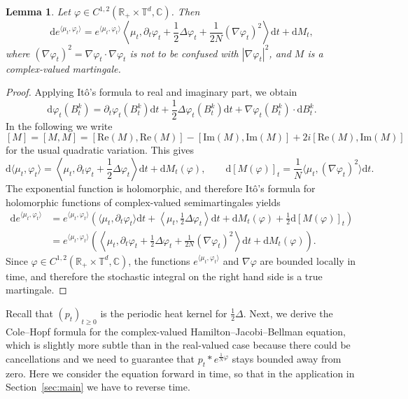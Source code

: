 \documentclass[a4paper,12pt]{article}
\newcommand{\mathd}{\mathrm{d}}
\newtheorem{lemma}[theorem]{Lemma}
\newcommand{\R}{\mathbb{R}}
\newcommand{\T}{\mathbb{T}}
\newcommand{\C}{\mathbb{C}}
\begin{document}
\begin{lemma}\label{lem:duality}
    Let $\varphi\in C^{1,2}(\R_+\times \T^d,\C)$. Then
    \[
        \mathd e^{\langle \mu_t, \varphi_t \rangle} = e^{\langle \mu_t, \varphi_t \rangle}  \left\langle \mu_t,  \partial_t \varphi_t + \frac{1}{2} \Delta \varphi_t + \frac{1}{2 N} (\nabla  \varphi_t)^2 \right\rangle \mathd t  + \mathd M_t,
    \]
    where $(\nabla \varphi_t)^2 = \nabla \varphi_t\cdot \nabla \varphi_t$ is not to be confused with $|\nabla \varphi_t|^2$, and $M$ is a complex-valued martingale.
\end{lemma}

\begin{proof}
    Applying It\^o's formula to real and imaginary part, we obtain
\[ \mathd \varphi_t (B^k_t) = \partial_t \varphi_t(B^k_t)\mathd t + \frac{1}{2} \Delta \varphi_t (B^k_t)\mathd t + \nabla
   \varphi_t (B^k_t) \cdot \mathd B^k_t. \]
In the following we write
    \[
        [M]=[M,M] = [\mathrm{Re}(M), \mathrm{Re}(M)] - [\mathrm{Im}(M),\mathrm{Im}(M)] + 2i[\mathrm{Re}(M),\mathrm{Im}(M)]
    \]
    for the usual quadratic variation. This gives
\[ \mathd \langle \mu_t, \varphi_t \rangle = \left\langle \mu_t, \partial_t \varphi_t + \frac{1}{2}
   \Delta \varphi_t \right\rangle \mathd t + \mathd M_t (\varphi), \qquad \mathd
   [ M (\varphi)]_t = \frac{1}{N} \langle \mu_t, (\nabla
   \varphi_t)^2 \rangle \mathd t. \]
The exponential function is holomorphic, and therefore It\^o's formula for holomorphic functions of complex-valued semimartingales yields
\begin{align*}
  \mathd e^{\langle \mu_t, \varphi_t \rangle} & = e^{\langle \mu_t,
  \varphi_t \rangle} \left( \langle \mu_t, \partial_t \varphi_t \rangle \mathd
  t + \left\langle \mu_t, \frac{1}{2} \Delta \varphi_t \right\rangle \mathd t
  + \mathd M_t (\varphi) + \frac{1}{2} \mathd [ M (\varphi)
  ]_t \right)\\
  & = e^{\langle \mu_t, \varphi_t \rangle} \left( \left\langle \mu_t,
  \partial_t \varphi_t + \frac{1}{2} \Delta \varphi_t + \frac{1}{2 N} (\nabla
  \varphi_t)^2 \right\rangle \mathd t + \mathd M_t (\varphi) \right) .
\end{align*}
Since $\varphi \in C^{1,2}(\R_+\times \T^d,\C)$, the functions $e^{\langle \mu_t, \varphi_t\rangle}$ and $\nabla \varphi$ are bounded locally in time, and therefore the stochastic integral on the right hand side is a true martingale.
\end{proof}

Recall that $(p_t)_{t\geq 0}$ is the periodic heat kernel for $\tfrac12 \Delta$. Next, we derive the Cole--Hopf formula for the complex-valued Hamilton--Jacobi--Bellman equation, which is slightly more subtle than in the real-valued case because there could be cancellations and we need to guarantee that $p_t \ast e^{\tfrac1N\varphi}$ stays bounded away from zero. Here we consider the equation forward in time, so that in the application in Section~\ref{sec:main} we have to reverse time.
\end{document}
